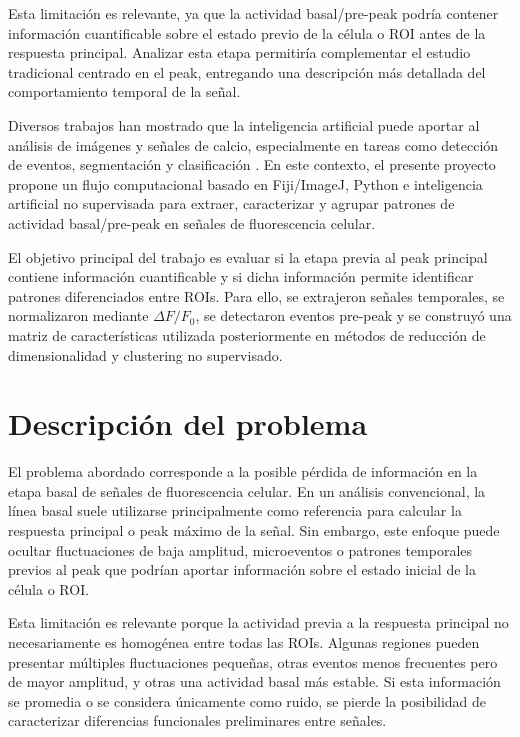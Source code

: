 \documentclass[10pt,twocolumn]{article}
\begin{document}
Esta limitación es relevante, ya que la actividad basal/pre-peak podría contener información cuantificable sobre el estado previo de la célula o ROI antes de la respuesta principal. Analizar esta etapa permitiría complementar el estudio tradicional centrado en el peak, entregando una descripción más detallada del comportamiento temporal de la señal.

Diversos trabajos han mostrado que la inteligencia artificial puede aportar al análisis de imágenes y señales de calcio, especialmente en tareas como detección de eventos, segmentación y clasificación \cite{yang2021,deepcinac2020}. En este contexto, el presente proyecto propone un flujo computacional basado en Fiji/ImageJ, Python e inteligencia artificial no supervisada para extraer, caracterizar y agrupar patrones de actividad basal/pre-peak en señales de fluorescencia celular.

El objetivo principal del trabajo es evaluar si la etapa previa al peak principal contiene información cuantificable y si dicha información permite identificar patrones diferenciados entre ROIs. Para ello, se extrajeron señales temporales, se normalizaron mediante $\Delta F/F_0$, se detectaron eventos pre-peak y se construyó una matriz de características utilizada posteriormente en métodos de reducción de dimensionalidad y clustering no supervisado.
\section{Descripción del problema}

El problema abordado corresponde a la posible pérdida de información en la etapa basal de señales de fluorescencia celular. En un análisis convencional, la línea basal suele utilizarse principalmente como referencia para calcular la respuesta principal o peak máximo de la señal. Sin embargo, este enfoque puede ocultar fluctuaciones de baja amplitud, microeventos o patrones temporales previos al peak que podrían aportar información sobre el estado inicial de la célula o ROI.

Esta limitación es relevante porque la actividad previa a la respuesta principal no necesariamente es homogénea entre todas las ROIs. Algunas regiones pueden presentar múltiples fluctuaciones pequeñas, otras eventos menos frecuentes pero de mayor amplitud, y otras una actividad basal más estable. Si esta información se promedia o se considera únicamente como ruido, se pierde la posibilidad de caracterizar diferencias funcionales preliminares entre señales.
\end{document}
